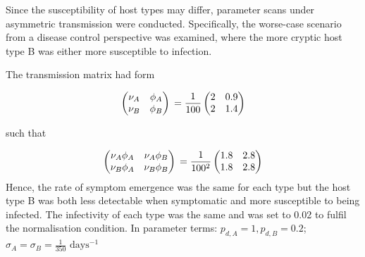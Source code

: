\documentclass[11pt,letterpaper]{article}
\begin{document}
Since the susceptibility of host types may differ, parameter scans under asymmetric transmission were conducted. Specifically, the worse-case scenario from a disease control perspective was examined, where the more cryptic host type B was either more susceptible to infection.

The transmission matrix had form

\begin{equation}
	\begin{pmatrix}
		\nu_{A} & \phi_{A} \\
		\nu_{B} & \phi_{B}  \\
	\end{pmatrix} 
\newline
= \frac{1}{100}
	\begin{pmatrix}
	2 & 0.9 \\
	2 & 1.4 \\
\end{pmatrix} 
\end{equation}

such that 


\begin{equation}
	\begin{pmatrix}
		\nu_{A} \phi_{A}  & \nu_{A} \phi_{B}  \\
		\nu_{B} \phi_{A} & \nu_{B} \phi_{B} \\
	\end{pmatrix} \\
 = \frac{1}{100^2} \begin{pmatrix}
 1.8  & 2.8 \\
 1.8 & 2.8 \\
 \end{pmatrix} 
\end{equation}
 Hence, the rate of symptom emergence was the same for each type but the host type B was both less detectable when symptomatic and more susceptible to being infected. The infectivity of each type was the same and was set to 0.02 to fulfil the normalisation condition. In parameter terms: $p_{d,A} = 1, p_{d,B} = 0.2$; $\sigma_{A} = \sigma_{B} =\frac{1}{350}$ $\mathrm{days^{-1}}$
\end{document}
